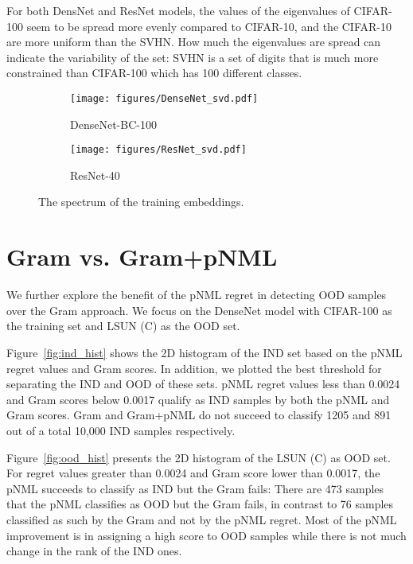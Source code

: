 \documentclass{article}
\def\Figref#1{Figure~\ref{#1}}
\begin{document}
For both DensNet and ResNet models, the values of the eigenvalues of CIFAR-100 seem to be spread more evenly compared to CIFAR-10, and the CIFAR-10 are more uniform than the SVHN. 
How much the eigenvalues are spread can indicate the variability of the set: SVHN is a set of digits that is much more constrained than CIFAR-100 which has 100 different classes. 


\begin{figure}[tb]
    \centering
\begin{subfigure}[t]{0.49\linewidth}
    \texttt{[image: figures/DenseNet\_svd.pdf]}
    \caption{DenseNet-BC-100  \label{fig:DenseNet_svd}}   
\end{subfigure}
\begin{subfigure}[t]{0.49\linewidth}
    \texttt{[image: figures/ResNet\_svd.pdf]}
    \caption{ResNet-40 \label{fig:ResNet_svd}}   
\end{subfigure}
\caption{The spectrum of the training embeddings.}
\label{fig:svd}
\end{figure}















\section{Gram vs. Gram+pNML}
\label{appendix:gram_vs_gram_plus_pnml}
We further explore the benefit of the pNML regret in detecting OOD samples over the Gram approach.
We focus on the DenseNet model with CIFAR-100 as the training set and LSUN (C) as the OOD set.

\Figref{fig:ind_hist} shows the 2D histogram of the IND set based on the pNML regret values and Gram scores. 
In addition, we plotted the best threshold for separating the IND and OOD of these sets.
pNML regret values less than 0.0024 and Gram scores below 0.0017 qualify as IND samples by both the pNML and Gram scores. 
Gram and Gram+pNML do not succeed to classify 1205 and 891 out of a total 10,000 IND samples respectively.

\Figref{fig:ood_hist} presents the 2D histogram of the LSUN (C) as OOD set. 
For regret values greater than 0.0024 and Gram score lower than 0.0017, the pNML succeeds to classify as IND but the Gram fails: 
There are 473 samples that the pNML classifies as OOD but the Gram fails, in contrast to 76 samples classified as such by the Gram and not by the pNML regret.
Most of the pNML improvement is in assigning a high score to OOD samples while there is not much change in the rank of the IND ones.
\end{document}
